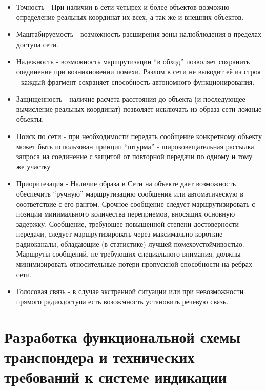 \documentclass[a4paper,12pt]{report} %
\begin{document}
\begin{itemize}
\item Точность - При наличии в сети четырех и более объектов возможно
  определение реальных координат их всех, а так же и внешних объектов. 
\item Маштабируемость - возможность расширения зоны налюблюдения в пределах
  доступа сети.
\item Надежность - возможность маршрутизации ``в обход'' позволяет сохранить
  соединение при возникновении помехи. Разлом в сети не выводит её из строя -
  каждый фрагмент сохраняет способность автономного функционирования.
\item Защищенность - наличие расчета расстояния до объекта (и последующее
  вычисление реальных координат) позволяет исключать из образа сети ложные
  объекты.
\item Поиск по сети - при необходимости передать сообщение конкретному объекту
  может быть использован принцип ``штурма'' - широковещательная рассылка запроса
  на соединение с защитой от повторной передачи по одному и тому же участку
\item Приоритезация - Наличие образа в Сети на объекте дает возможность
  обеспечить ``ручную'' маршрутизацию сообщения или автоматическую в
  соответствие с его рангом. Срочное сообщение следует маршрутизировать с
  позиции минимального количества переприемов,  вносящих основную задержку.
  Сообщение, требующее повышенной степени достоверности передачи, следует
  маршрутизировать через максимально короткие радиоканалы, обладающие (в
  статистике) лучшей помехоустойчивостью. Маршруты сообщений, не требующих
  специального внимания, должны минимизировать относительные потери пропускной
  способности на ребрах сети. 
\item Голосовая связь - в случае экстренной ситуации или при невозможности
  прямого радиодоступа есть возожмность установить речевую связь.
\end{itemize}
\newpage

\chapter{Разработка функциональной схемы транспондера и технических требований к
  системе индикации} %
\end{document}
